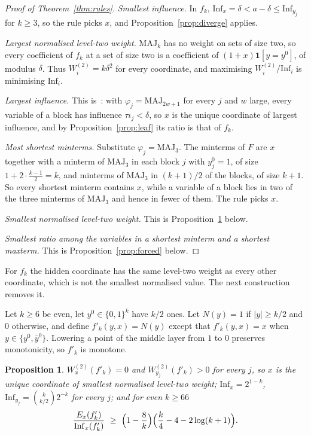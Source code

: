 \documentclass[11pt]{amsart}
\newtheorem{proposition}[theorem]{Proposition}
\theoremstyle{remark}
\newcommand{\Inf}{\mathrm{Inf}}
\newcommand{\MAJ}{\mathrm{MAJ}}
\begin{document}
\begin{proof}[Proof of Theorem~\ref{thm:rules}]
\emph{Smallest influence.} In $f_k$, $\Inf_x=\delta<a-\delta\le\Inf_{y_j}$ for $k\ge3$, so the rule picks $x$, and
Proposition~\ref{prop:diverge} applies.

\emph{Largest normalised level-two weight.} $\MAJ_k$ has no weight on sets of size two, so every coefficient of $f_k$
at a set of size two is a coefficient of $(1+x)\mathbf 1[y=y^0]$, of modulus $\delta$. Thus $W^{(2)}_i=k\delta^2$ for
every coordinate, and maximising $W^{(2)}_i/\Inf_i$ is minimising $\Inf_i$.

\emph{Largest influence.} This is~\cite[Proposition~5.1]{Shm3}: with $\varphi_j=\MAJ_{2w+1}$ for every $j$ and $w$
large, every variable of a block has influence $\tau\iota_j<\delta$, so $x$ is the unique coordinate of largest
influence, and by Proposition~\ref{prop:leaf} its ratio is that of $f_k$.

\emph{Most shortest minterms.} Substitute $\varphi_j=\MAJ_3$. The minterms of $F$ are $x$ together with a minterm of
$\MAJ_3$ in each block $j$ with $y^0_j=1$, of size $1+2\cdot\frac{k-1}2=k$, and minterms of $\MAJ_3$ in $(k+1)/2$ of the
blocks, of size $k+1$. So every shortest minterm contains $x$, while a variable of a block lies in two of the three
minterms of $\MAJ_3$ and hence in fewer of them. The rule picks $x$.

\emph{Smallest normalised level-two weight.} This is Proposition~\ref{prop:pair} below.

\emph{Smallest ratio among the variables in a shortest minterm and a shortest maxterm.} This is
Proposition~\ref{prop:forced} below.
\end{proof}

For $f_k$ the hidden coordinate has the same level-two weight as every other coordinate, which is not the smallest
normalised value. The next construction removes it.

Let $k\ge6$ be even, let $y^0\in\{0,1\}^k$ have $k/2$ ones. Let $N(y)=1$ if $|y|\ge k/2$ and $0$
otherwise, and define $f'_k(y,x)=N(y)$ except that $f'_k(y,x)=x$ when $y\in\{y^0,\bar y^0\}$. Lowering a point of the middle
layer from $1$ to $0$ preserves monotonicity, so $f'_k$ is monotone.

\begin{proposition}\label{prop:pair}
$W^{(2)}_x(f'_k)=0$ and $W^{(2)}_{y_j}(f'_k)>0$ for every $j$, so $x$ is the unique coordinate of smallest normalised
level-two weight; $\Inf_x=2^{1-k}$, $\Inf_{y_j}=\binom{k}{k/2}2^{-k}$ for every $j$; and for even $k\ge66$
\[
\frac{E_x(f'_k)}{\Inf_x(f'_k)}\ \ge\ \Bigl(1-\frac8k\Bigr)\Bigl(\frac k4-4-2\log(k+1)\Bigr).
\]
\end{proposition}
\end{document}
